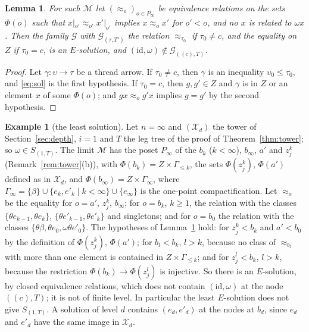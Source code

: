\documentclass[11pt]{amsart}
\newtheorem{lem}[thm]{Lemma}
\theoremstyle{definition}
\newtheorem{ex}[thm]{Example}
\newcommand{\cX}{\mathcal X}
\newcommand{\cM}{\mathcal M}
\newcommand{\id}{\mathrm{id}}
\begin{document}
\begin{lem}\label{lem:conesol}
For such $\cM$ let $(\approx_o)_{o\in P_\infty}$ be equivalence
relations on the sets $\Phi(o)$ such that $x|_{o'}\approx_{o'}
x'|_{o'}$ implies $x\approx_ox'$ for $o'<o$, and no $x$ is related to
$\omega x$. Then the family $\mathcal G$ with $\mathcal G_{(\tau,T')}$
the relation $\approx_{\tau_0}$ if $\tau_0\ne c$, and the equality on
$Z$ if $\tau_0=c$, is an $E$-solution, and
$(\id,\omega)\notin\mathcal G_{((c),T)}$.
\end{lem}
\begin{proof}
Let $\gamma\colon\upsilon\to\tau$ be a thread arrow. If $\tau_0\ne
c$, then $\gamma$ is an inequality $\upsilon_0\le\tau_0$, and
\eqref{eq:sol} is the first hypothesis. If $\tau_0=c$, then
$g,g'\in Z$ and $\gamma$ is in $Z$ or an element $x$ of some
$\Phi(o)$; and $gx\approx_og'x$ implies $g=g'$ by the second
hypothesis.
\end{proof}

\begin{ex}[the least solution]\label{ex:towersol}
Let $n=\infty$ and $(\cX_d)$ the tower of Section~\ref{sec:depth},
$i=1$ and $T$ the leg tree of the proof of Theorem~\ref{thm:tower};
so $\omega\in S_{(1,T)}$. The limit $\cM$ has the poset $P_\infty$ of
the $b_k$ ($k<\infty$), $b_\infty$, $a'$ and $z^k_j$
(Remark~\ref{rem:tower}(b)), with $\Phi(b_k)=Z\times\Gamma_{\le k}$,
the sets $\Phi(z^k_j)$, $\Phi(a')$ defined as in $\cX_d$, and
$\Phi(b_\infty)=Z\times\Gamma_\infty$, where $\Gamma_\infty=\{\beta\}
\cup\{e_k,e'_k\mid k<\infty\}\cup\{e_\infty\}$ is the one-point
compactification. Let $\approx_o$ be the equality for $o=a'$,
$z^k_j$, $b_\infty$; for $o=b_k$, $k\ge1$, the relation with the
classes $\{\theta e_{k-1},\theta e_k\}$, $\{\theta e'_{k-1},\theta
e'_k\}$ and singletons; and for $o=b_0$ the relation with the classes
$\{\theta\beta,\theta e_0,\omega\theta e'_0\}$. The hypotheses of
Lemma~\ref{lem:conesol} hold: for $z^k_j<b_k$ and $a'<b_0$ by the
definition of $\Phi(z^k_j)$, $\Phi(a')$; for $b_l<b_k$, $l>k$,
because no class of $\approx_{b_l}$ with more than one element is
contained in $Z\times\Gamma_{\le k}$; and for $z^l_j<b_k$, $l>k$,
because the restriction $\Phi(b_k)\to\Phi(z^l_j)$ is injective. So
there is an $E$-solution, by closed equivalence relations, which does
not contain $(\id,\omega)$ at the node $((c),T)$; it is not of finite
level. In particular the least $E$-solution does not give
$S_{(1,T)}$. A solution of level $d$ contains
$(e_d,e'_d)$ at the nodes at $b_d$, since $e_d$ and $e'_d$ have the
same image in $\cX_d$.
\end{ex}
\end{document}
